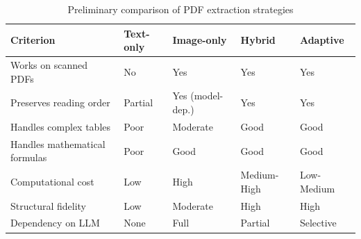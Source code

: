 \begin{table}[ht]
\centering
\caption{Preliminary comparison of PDF extraction strategies}
\label{tab:strategy_comparison}
\renewcommand{\arraystretch}{1.4}
\begin{tabularx}{\textwidth}{lXXXX}
\toprule
\textbf{Criterion} & \textbf{Text-only} & \textbf{Image-only} & \textbf{Hybrid} & \textbf{Adaptive} \\
\midrule
Works on scanned PDFs        & No      & Yes               & Yes          & Yes      \\
Preserves reading order      & Partial & Yes (model-dep.)  & Yes          & Yes      \\
Handles complex tables       & Poor    & Moderate          & Good         & Good     \\
Handles mathematical formulas & Poor   & Good              & Good         & Good     \\
Computational cost           & Low     & High              & \mbox{Medium-High}  & \mbox{Low-Medium} \\
Structural fidelity          & Low     & Moderate          & High         & High     \\
Dependency on LLM            & None    & Full              & Partial      & Selective \\
\bottomrule
\end{tabularx}
\end{table}
